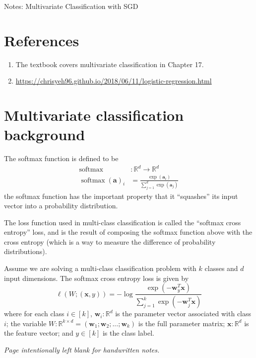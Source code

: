 \documentclass[10pt]{article}
\theoremstyle{definition}
\newcommand{\R}{\mathbb R}
\DeclareMathOperator*{\softmax}{softmax}
\newcommand{\trans}[1]{{#1}^{T}}
\newcommand{\aaa}{\mathbf a}
\newcommand{\w}{\mathbf w}
\newcommand{\x}{\mathbf x}
\begin{document}
\begin{center}
\Huge
Notes: Multivariate Classification with SGD
\end{center}


\section{References}

\begin{enumerate}
    \item
        The textbook covers multivariate classification in Chapter 17.
    \item
        \url{https://chrisyeh96.github.io/2018/06/11/logistic-regression.html}
\end{enumerate}

\section{Multivariate classification background}

The softmax function is defined to be
\begin{align}
    \softmax &: \R^d \to \R^d \\
    \softmax(\aaa)_i &= \frac {\exp(\aaa_i)}{\sum_{j=1}^d \exp(\aaa_j)}
\end{align}
the softmax function has the important property that it ``squashes'' its input vector into a probability distribution.

The loss function used in multi-class classification is called the ``softmax cross entropy'' loss,
and is the result of composing the softmax function above with the cross entropy
(which is a way to measure the difference of probability distributions).

Assume we are solving a multi-class classification problem with $k$ classes and $d$ input dimensions.
The softmax cross entropy loss is given by
\begin{equation}
    \ell(W;(\x,y)) = - \log \frac {\exp(-\trans\w_y \x)}{\sum_{j=1}^k \exp(-\trans \w_j \x)}
\end{equation}
where for each class $i\in[k]$,
$\w_i : \R^d$ is the parameter vector associated with class $i$;
the variable $W : \R^{k \times d} = (\w_1; \w_2; ...; \w_k)$ is the full parameter matrix;
$\x : \R^d$ is the feature vector;
and $y \in [k]$ is the class label.

\newpage
\noindent\emph{Page intentionally left blank for handwritten notes.}
\end{document}
